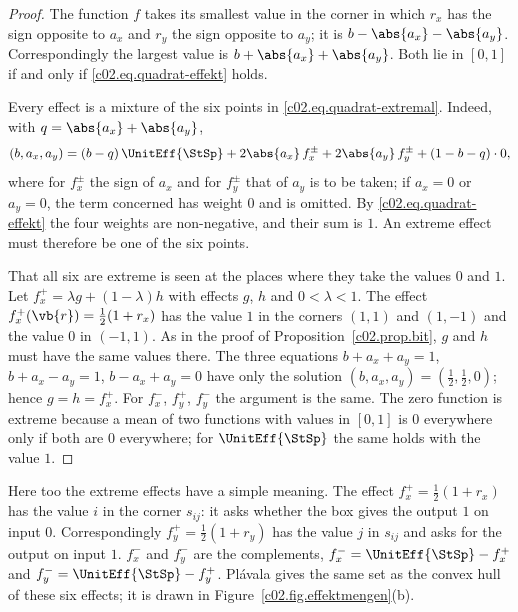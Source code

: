 \begin{proof}
  The function $f$ takes its smallest value in the corner in which $r_x$ has the sign
  opposite to $a_x$ and $r_y$ the sign opposite to $a_y$; it is
  $b - \abs{a_x} - \abs{a_y}$. Correspondingly the largest value is
  $b + \abs{a_x} + \abs{a_y}$. Both lie in $[0,1]$ if and only if
  \eqref{c02.eq.quadrat-effekt} holds.

  Every effect is a mixture of the six points in \eqref{c02.eq.quadrat-extremal}. Indeed,
  with $q = \abs{a_x} + \abs{a_y}$,
  \begin{equation*}
    (b, a_x, a_y) = (b - q)\,\UnitEff{\StSp} + 2\abs{a_x}\, f_x^{\pm} + 2\abs{a_y}\, f_y^{\pm} + (1 - b - q)\cdot 0 ,
  \end{equation*}
  where for $f_x^{\pm}$ the sign of $a_x$ and for $f_y^{\pm}$ that of $a_y$ is to be taken;
  if $a_x = 0$ or $a_y = 0$, the term concerned has weight $0$ and is omitted.
  By \eqref{c02.eq.quadrat-effekt} the four weights are non-negative, and their sum is
  $1$. An extreme effect must therefore be one of the six points.

  That all six are extreme is seen at the places where they take the values $0$ and $1$.
  Let $f_x^{+} = \lambda g + (1-\lambda) h$ with effects $g$, $h$ and $0 < \lambda < 1$.
  The effect $f_x^{+}(\vb{r}) = \tfrac12(1 + r_x)$ has the value $1$ in the corners $(1,1)$
  and $(1,-1)$ and the value $0$ in $(-1,1)$. As in the proof of
  Proposition~\ref{c02.prop.bit}, $g$ and $h$ must have the same values there. The three
  equations $b + a_x + a_y = 1$, $b + a_x - a_y = 1$, $b - a_x + a_y = 0$ have only the
  solution $(b, a_x, a_y) = (\tfrac12, \tfrac12, 0)$; hence $g = h = f_x^{+}$. For
  $f_x^{-}$, $f_y^{+}$, $f_y^{-}$ the argument is the same. The zero function is extreme
  because a mean of two functions with values in $[0,1]$ is $0$ everywhere only if both
  are $0$ everywhere; for $\UnitEff{\StSp}$ the same holds with the value $1$.
\end{proof}

Here too the extreme effects have a simple meaning. The effect
$f_x^{+} = \tfrac12(1 + r_x)$ has the value $i$ in the corner $s_{ij}$: it asks whether the
box gives the output $1$ on input $0$. Correspondingly $f_y^{+} = \tfrac12(1 + r_y)$ has
the value $j$ in $s_{ij}$ and asks for the output on input $1$. $f_x^{-}$ and $f_y^{-}$ are
the complements, $f_x^{-} = \UnitEff{\StSp} - f_x^{+}$ and
$f_y^{-} = \UnitEff{\StSp} - f_y^{+}$. Plávala gives the same set as the convex hull of
these six effects; it is drawn in Figure~\ref{c02.fig.effektmengen}(b).

